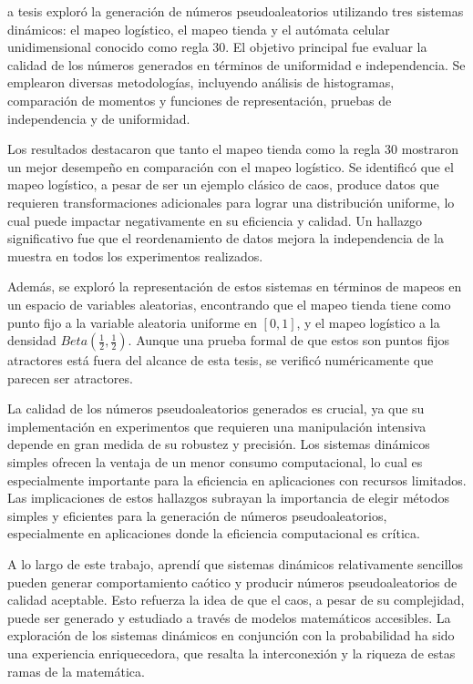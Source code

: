 \documentclass[../Main.tex]{subfiles}
\begin{document}
\MakeLowercase{a} tesis exploró la generación de números pseudoaleatorios utilizando tres sistemas dinámicos: el mapeo logístico, el mapeo tienda y el autómata celular unidimensional conocido como regla 30. El objetivo principal fue evaluar la calidad de los números generados en términos de uniformidad e independencia. Se emplearon diversas metodologías, incluyendo análisis de histogramas, comparación de momentos y funciones de representación, pruebas de independencia y de uniformidad.

Los resultados destacaron que tanto el mapeo tienda como la regla 30 mostraron un mejor desempeño en comparación con el mapeo logístico. Se identificó que el mapeo logístico, a pesar de ser un ejemplo clásico de caos, produce datos que requieren transformaciones adicionales para lograr una distribución uniforme, lo cual puede impactar negativamente en su eficiencia y calidad. Un hallazgo significativo fue que el reordenamiento de datos mejora la independencia de la muestra en todos los experimentos realizados. 

Además, se exploró la representación de estos sistemas en términos de mapeos en un espacio de variables aleatorias, encontrando que el mapeo tienda tiene como punto fijo a la variable aleatoria uniforme en $[0,1]$, y el mapeo logístico a la densidad $Beta(\frac{1}{2},\frac{1}{2})$. Aunque una prueba formal de que estos son puntos fijos atractores está fuera del alcance de esta tesis, se verificó numéricamente que parecen ser atractores.

La calidad de los números pseudoaleatorios generados es crucial, ya que su implementación en experimentos que requieren una manipulación intensiva depende en gran medida de su robustez y precisión. Los sistemas dinámicos simples ofrecen la ventaja de un menor consumo computacional, lo cual es especialmente importante para la eficiencia en aplicaciones con recursos limitados. Las implicaciones de estos hallazgos subrayan la importancia de elegir métodos simples y eficientes para la generación de números pseudoaleatorios, especialmente en aplicaciones donde la eficiencia computacional es crítica. 

A lo largo de este trabajo, aprendí que sistemas dinámicos relativamente sencillos pueden generar comportamiento caótico y producir números pseudoaleatorios de calidad aceptable. Esto refuerza la idea de que el caos, a pesar de su complejidad, puede ser generado y estudiado a través de modelos matemáticos accesibles. La exploración de los sistemas dinámicos en conjunción con la probabilidad ha sido una experiencia enriquecedora, que resalta la interconexión y la riqueza de estas ramas de la matemática.
\end{document}
